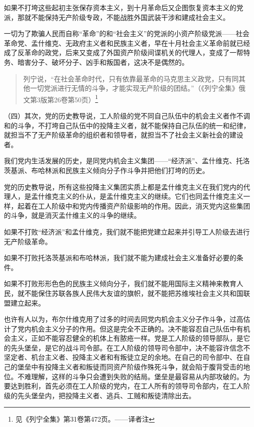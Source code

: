 如果不打垮这些起初主张保存资本主义，到十月革命后又企图恢复资本主义的党派，那就不能保持无产阶级专政，不能战胜外国武装干涉和建成社会主义。

一切为了欺骗人民而自称“革命”的和“社会主义”的党派的小资产阶级党派——社会革命党、孟什维克、无政府主义者和民族主义者，早在十月社会主义革命前就已经成了反革命的政党，后来又变成了外国资产阶级间谍机关的代理人，变成了一帮特务、暗害分子、破坏分子、凶手和叛国者，这决不是偶然的。

\begin{quotation}
列宁说，“在社会革命时代，只有依靠最革命的马克思主义政党，只有同其他一切党派进行无情的斗争，才能实现无产阶级的团结。”（《列宁全集》俄文第3版第26卷第50页）\footnote{见《列宁全集》第31卷第472页。——译者注}
\end{quotation}

（四）其次，党的历史教导说，工人阶级的党不同自己队伍中的机会主义者作不调和的斗争，不打垮自己队伍中的投降主义者，就不能保持自己队伍的统一和纪律，就担当不了无产阶级革命的组织者和领导者，就担当不了社会主义新社会的建设者。

我们党内生活发展的历史，是同党内机会主义集团——“经济派”、孟什维克、托洛茨基派、布哈林派和民族主义倾向分子作斗争并把他们打垮的历史。

党的历史教导说，所有这些投降主义集团实质上都是孟什维克主义在我们党内的代理人，是孟什维克主义的仆从，是孟什维克主义的继续。它们也同孟什维克主义一样，起着在工人阶级中和党内传播资产阶级影响的作用。因此，消灭党内这些集团的斗争，就是消灭孟什维主义的斗争的继续。

如果不打败“经济派”和孟什维克，我们就不能把党建立起来并引导工人阶级去进行无产阶级革命。

如果不打败托洛茨基派和布哈林派，我们就不能为建成社会主义准备好必要的条件。

如果不打败形形色色的民族主义倾向分子，我们就不能用国际主义精神来教育人民，就不能保住苏联各族人民伟大友谊的旗帜，就不能把苏维埃社会主义共和国联盟建立起来。

也许有人以为，布尔什维克用了过多的时间去同党内机会主义分子作斗争，过高估计了党内机会主义分子的作用。但这是完全不正确的。决不能容忍自己队伍中有机会主义，正如不能容忍健全的机体上有脓疮一样。党是工人阶级的领导部队，是它的先头堡垒，是它的战斗司令部。在工人阶级的领导司令部中，决不能容许信念不坚定者、机台主义者、投降主义者和有叛徒立足的余地。在自己的司令部中、在自己的堡垒中有投降主义者和叛徒而同资产阶级作殊死斗争，就会陷于腹背受击的地位。不难理解，这样的斗争只会遭到失败的结局。堡垒是最容易从内部攻破的。为要达到胜利，首先必须在工人阶级的党内，在工人所有的领导司令部内，在工人阶级的先头堡垒内，把投降主义者、逃兵、工贼和叛徒清除出去。

